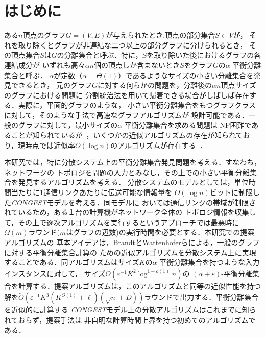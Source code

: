 \documentclass{thesis}
\theoremstyle{definition}
\begin{document}
\baselineskip=22pt
\pagestyle{empty}

\maketitle

\pagestyle{myheadings}	%
\tableofcontents

\newpage


\chapter{はじめに}

ある$n$頂点のグラフ$G=(V,E)$が与えられたとき,頂点の部分集合$S \subset V$が，
それを取り除くとグラフが非連結な二つ以上の部分グラフに分けられるとき，
その頂点集合$S$は$G$の分離集合と呼ぶ．特に，$S$を取り除いた後におけるグラフの各連結成分が
いずれも高々$\alpha n$個の頂点しか含まないとき$S$をグラフ$G$の$\alpha$-平衡分離集合と呼ぶ．
$\alpha$が定数（$\alpha = \Theta(1)$）であるようなサイズの小さい分離集合を発見できるとき，
元のグラフ$G$に対する何らかの問題を，分離後の$\alpha n$頂点サイズのグラフにおける問題に
分割統治法を用いて帰着できる場合がしばしば存在する．実際に，平面的グラフのような，
小さい平衡分離集合をもつグラフクラスに対して，そのような手法で高速なグラフアルゴリズムが
設計可能である．一般のグラフに対して，最小サイズの$\alpha$-平衡分離集合を求める問題は
NP困難であることが知られているが~\cite{bui1992finding}，いくつかの近似アルゴリズムの存在が知られており，現時点では近似率$O(\log n)$のアルゴリズムが存在する~\cite{}．

本研究では，特に分散システム上の平衡分離集合発見問題を考える．すなわち，ネットワークの
トポロジを問題の入力とみなし，その上での小さい平衡分離集合を発見するアルゴリズムを考える．
分散システムのモデルとしては，単位時間当たりに1通信リンクあたりに伝送可能な情報量を
$O(\log n)$ビットに制限した\textit{CONGEST}モデルを考える．同モデルに
おいては通信リンクの帯域が制限されているため，ある１台の計算機がネットワーク全体の
トポロジ情報を収集して，その上で逐次アルゴリズムを実行するというアプローチでは最悪時に
$\Omega(m)$ラウンド($m$はグラフの辺数)の実行時間を必要とする．本研究での提案アルゴリズムの
基本アイデアは，BrandtとWattenhoferらによる，一般のグラフに対する平衡分離集合計算の
ための近似アルゴリズム\cite{brandt2017approximating}を分散システム上に実現することである．同アルゴリズムはサイズ$K$の$\alpha$-平衡分離集合を持つような入力インスタンスに対して，
サイズ$O(\varepsilon^{-1}K^2\log^{1+o(1)}n)$の $(\alpha + \varepsilon)$-平衡分離集合を計算する．提案アルゴリズムは，このアルゴリズムと同等の近似性能を持つ解を$\tilde{O}(\varepsilon^{-1}K^3(K^{O(1)}+\ell)(\sqrt{n}+D))$ラウンドで出力する．平衡分離集合を近似的に計算する
\textit{CONGEST}モデル上の分散アルゴリズムはこれまでに知られておらず，提案手法は
非自明な計算時間上界を持つ初めてのアルゴリズムである．
\end{document}
